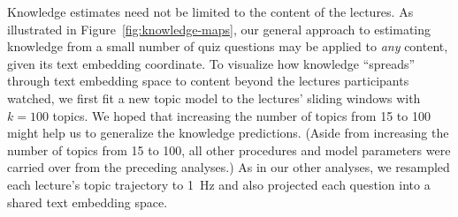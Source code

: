 \documentclass[10pt]{article}
\begin{document}
Knowledge estimates need not be limited to the content of the lectures. As
illustrated in Figure~\ref{fig:knowledge-maps}, our general approach to
estimating knowledge from a small number of quiz questions may be applied to
\textit{any} content, given its text embedding coordinate. To visualize how
knowledge ``spreads'' through text embedding space to content beyond the
lectures participants watched, we first fit a new topic model to the lectures'
sliding windows with $k = 100$ topics. We hoped that increasing the number of
topics from 15 to 100 might help us to generalize the knowledge predictions.
(Aside from increasing the number of topics from 15 to 100, all other
procedures and model parameters were carried over from the preceding analyses.)
As in our other analyses, we resampled each lecture's topic trajectory to 1~Hz
and also projected each question into a shared text embedding space.
\end{document}
